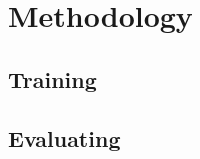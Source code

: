 \doublespacing %

\chapter{Methodology}
\label{ch2}

\begin{spacing}{1} %
\minitoc %
\end{spacing} %
\thesisspacing %

\section{Training}


\section{Evaluating}

